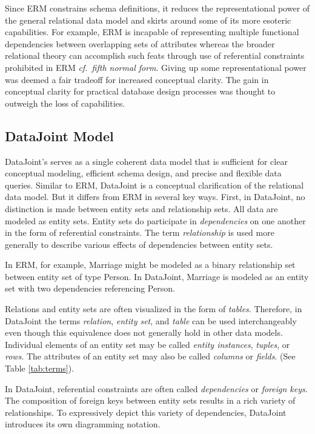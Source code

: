 \documentclass[letter,10pt]{article}
\newcommand{\datajoint}{DataJoint\xspace}
\begin{document}
Since ERM constrains schema definitions, it reduces the representational power of the general relational data model and skirts around some of its more esoteric capabilities. 
For example, ERM is incapable of representing multiple functional dependencies between overlapping sets of attributes whereas the broader relational theory can accomplish such feats through use of referential constraints prohibited in ERM {\em cf.\ fifth normal form}.
Giving up some representational power was deemed a fair tradeoff for increased conceptual clarity.  The gain in conceptual clarity for practical database design processes was thought to outweigh the loss of capabilities.

\subsection{DataJoint Model}
\datajoint's serves as a single coherent data model that is sufficient for clear conceptual modeling, efficient schema design, and precise and flexible data queries. 
Similar to ERM, \datajoint is a conceptual clarification of the relational data model.  
But it differs from ERM in several key ways. 
First, in \datajoint, no distinction is made between entity sets and relationship sets.  All data are modeled as entity sets.
Entity sets do participate in \emph{dependencies} on one another in the form of referential constraints.  The term \emph{relationship} is used more generally to describe various  effects of dependencies between entity sets.

In ERM, for example, Marriage might be modeled as a binary relationship set between entity set of type Person.  In \datajoint, Marriage is modeled as an entity set with two dependencies referencing Person. 

Relations and entity sets are often visualized in the form of \emph{tables}. 
Therefore, in \datajoint the terms \emph{relation}, \emph{entity set}, and \emph{table} can be used interchangeably even though this equivalence does not generally hold in other data models. 
Individual elements of an entity set may be called \emph{entity instances}, \emph{tuples}, or \emph{rows}.
The attributes of an entity set may also be called \emph{columns} or \emph{fields}. (See Table \ref{tab:terms}).

In \datajoint, referential constraints are often called \emph{dependencies} or \emph{foreign keys}.  
The composition of foreign keys between entity sets results in a rich variety of relationships. 
To expressively depict this variety of dependencies, \datajoint introduces its own diagramming notation.
\end{document}
